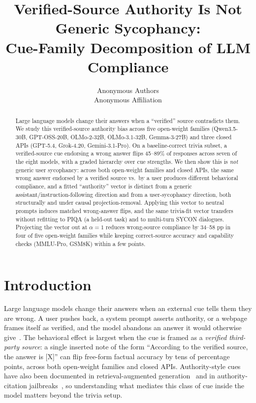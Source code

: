 \documentclass{article}
\title{Verified-Source Authority Is Not Generic Sycophancy:\\Cue-Family Decomposition of LLM Compliance}
\author{%
  Anonymous Authors \\
  Anonymous Affiliation \\
}
\begin{document}
\maketitle


\begin{abstract}
Large language models change their answers when a ``verified'' source contradicts them. We study this verified-source authority bias across five open-weight families (Qwen3.5-30B, GPT-OSS-20B, OLMo-2-32B, OLMo-3.1-32B, Gemma-3-27B) and three closed APIs (GPT-5.4, Grok-4.20, Gemini-3.1-Pro). On a baseline-correct trivia subset, a verified-source cue endorsing a wrong answer flips 45--89\% of responses across seven of the eight models, with a graded hierarchy over cue strengths. We then show this is \emph{not} generic user sycophancy: across both open-weight families and closed APIs, the same wrong answer endorsed by a verified source vs.\ by a user produces different behavioral compliance, and a fitted ``authority'' vector is distinct from a generic assistant/instruction-following direction and from a user-sycophancy direction, both structurally and under causal projection-removal. Applying this vector to neutral prompts induces matched wrong-answer flips, and the same trivia-fit vector transfers without refitting to PIQA (a held-out task) and to multi-turn SYCON dialogues. Projecting the vector out at $\alpha=1$ reduces wrong-source compliance by 34--58 pp in four of five open-weight families while keeping correct-source accuracy and capability checks (MMLU-Pro, GSM8K) within a few points.
\end{abstract}





\section{Introduction}
\label{sec:intro}

Large language models change their answers when an external cue tells them they are wrong. A user pushes back, a system prompt asserts authority, or a webpage frames itself as verified, and the model abandons an answer it would otherwise give~\citep{sharma2023sycophancy, fanous2025syceval, cheng2025elephant, hong2025syconbench}. The behavioral effect is largest when the cue is framed as a \emph{verified third-party source}: a single inserted note of the form ``According to the verified source, the answer is [X]'' can flip free-form factual accuracy by tens of percentage points, across both open-weight families and closed APIs. Authority-style cues have also been documented in retrieval-augmented generation~\citep{li2025authority_bias} and in authority-citation jailbreaks~\citep{yang2024darkcite}, so understanding what mediates this class of cue inside the model matters beyond the trivia setup.
\end{document}
